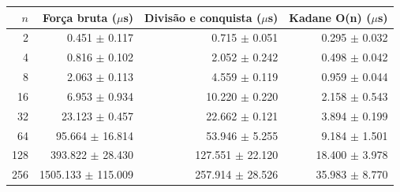 \begin{tabular}{rrrr}
\hline
$n$ & Força bruta ($\mu$s) & Divisão e conquista ($\mu$s) & Kadane O(n) ($\mu$s) \\
\hline
2 & 0.451 $\pm$ 0.117 & 0.715 $\pm$ 0.051 & 0.295 $\pm$ 0.032 \\
4 & 0.816 $\pm$ 0.102 & 2.052 $\pm$ 0.242 & 0.498 $\pm$ 0.042 \\
8 & 2.063 $\pm$ 0.113 & 4.559 $\pm$ 0.119 & 0.959 $\pm$ 0.044 \\
16 & 6.953 $\pm$ 0.934 & 10.220 $\pm$ 0.220 & 2.158 $\pm$ 0.543 \\
32 & 23.123 $\pm$ 0.457 & 22.662 $\pm$ 0.121 & 3.894 $\pm$ 0.199 \\
64 & 95.664 $\pm$ 16.814 & 53.946 $\pm$ 5.255 & 9.184 $\pm$ 1.501 \\
128 & 393.822 $\pm$ 28.430 & 127.551 $\pm$ 22.120 & 18.400 $\pm$ 3.978 \\
256 & 1505.133 $\pm$ 115.009 & 257.914 $\pm$ 28.526 & 35.983 $\pm$ 8.770 \\
\hline
\end{tabular}
